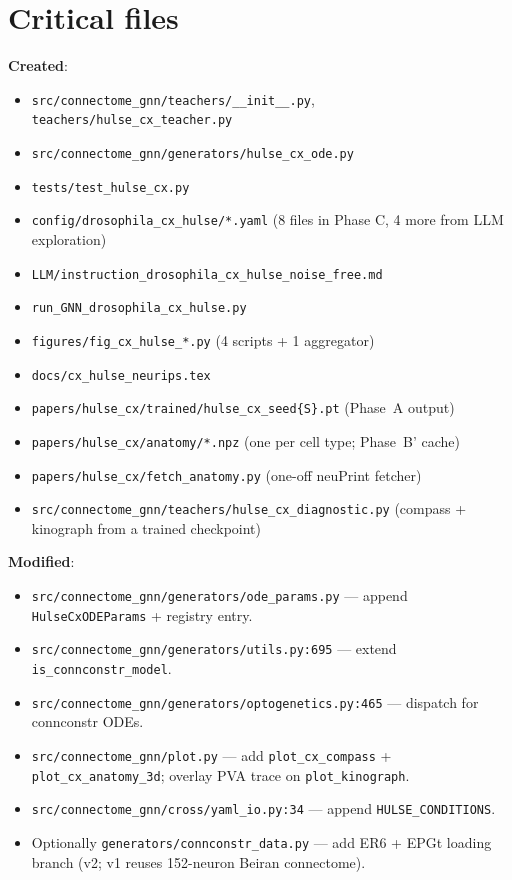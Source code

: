 \documentclass[11pt]{article}
\begin{document}
\section{Critical files}

\textbf{Created}:
\begin{itemize}[leftmargin=*, itemsep=0pt]
\item \texttt{src/connectome\_gnn/teachers/\_\_init\_\_.py}, \texttt{teachers/hulse\_cx\_teacher.py}
\item \texttt{src/connectome\_gnn/generators/hulse\_cx\_ode.py}
\item \texttt{tests/test\_hulse\_cx.py}
\item \texttt{config/drosophila\_cx\_hulse/*.yaml} (8 files in Phase C, 4 more from LLM exploration)
\item \texttt{LLM/instruction\_drosophila\_cx\_hulse\_noise\_free.md}
\item \texttt{run\_GNN\_drosophila\_cx\_hulse.py}
\item \texttt{figures/fig\_cx\_hulse\_*.py} (4 scripts + 1 aggregator)
\item \texttt{docs/cx\_hulse\_neurips.tex}
\item \texttt{papers/hulse\_cx/trained/hulse\_cx\_seed\{S\}.pt} (Phase~A output)
\item \texttt{papers/hulse\_cx/anatomy/*.npz} (one per cell type; Phase~B' cache)
\item \texttt{papers/hulse\_cx/fetch\_anatomy.py} (one-off neuPrint fetcher)
\item \texttt{src/connectome\_gnn/teachers/hulse\_cx\_diagnostic.py} (compass + kinograph from a trained checkpoint)
\end{itemize}

\textbf{Modified}:
\begin{itemize}[leftmargin=*, itemsep=0pt]
\item \texttt{src/connectome\_gnn/generators/ode\_params.py} ---
  append \texttt{HulseCxODEParams} + registry entry.
\item \texttt{src/connectome\_gnn/generators/utils.py:695} ---
  extend \texttt{is\_connconstr\_model}.
\item \texttt{src/connectome\_gnn/generators/optogenetics.py:465} ---
  dispatch for connconstr ODEs.
\item \texttt{src/connectome\_gnn/plot.py} ---
  add \texttt{plot\_cx\_compass} + \texttt{plot\_cx\_anatomy\_3d};
  overlay PVA trace on \texttt{plot\_kinograph}.
\item \texttt{src/connectome\_gnn/cross/yaml\_io.py:34} ---
  append \texttt{HULSE\_CONDITIONS}.
\item Optionally \texttt{generators/connconstr\_data.py} --- add ER6 +
  EPGt loading branch (v2; v1 reuses 152-neuron Beiran connectome).
\end{itemize}
\end{document}
